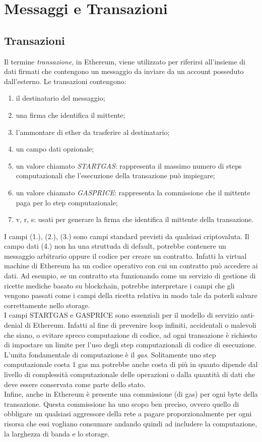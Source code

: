 \section{Messaggi e Transazioni}
%
\subsection{Transazioni}
%
Il termine \emph{transazione}, in Ethereum, viene utilizzato per riferirsi all'insieme di dati firmati che contengono un messaggio da inviare da un account posseduto dall'esterno. Le transazioni contengono:
\begin{enumerate}
	\item il destinatario del messaggio;
	\item una firma che identifica il mittente;
	\item l'ammontare di ether da trasferire al destinatario;
	\item un campo dati opzionale;
	\item un valore chiamato \emph{STARTGAS}: rappresenta il massimo numero di steps computazionali che l'esecuzione della transazione può impiegare;
	\item un valore chiamato \emph{GASPRICE}:  rappresenta la commissione che il mittente paga per lo step computazionale;
	\item v, r, s: usati per generare la firma che identifica il mittente della transazione.
\end{enumerate}
%
I campi (1.), (2.), (3.) sono campi standard previsti da qualsiasi criptovaluta. Il campo dati (4.) non ha una struttuda di default, potrebbe contenere un messaggio arbitrario oppure il codice per creare un contratto. Infatti la virtual machine di Ethereum ha un codice operativo con cui un contratto può accedere ai dati. Ad esempio, se un contratto sta funzionando come un servizio di gestione di ricette mediche basato su blockchain, potrebbe interpretare i campi che gli vengono passati come i campi della ricetta relativa in modo tale da poterli salvare correttamente nello storage. \\
I campi STARTGAS e GASPRICE sono essenziali per il modello di servizio anti-denial di Ethereum. Infatti al fine di prevenire loop infiniti, accidentali o malevoli che siano, o evitare spreco computazione di codice, ad ogni transazione è richiesto di impostare un limite per l'uso degli step computazionali di codice di esecuzione. L'unita fondamentale di computazione è il \emph{gas}. Solitamente uno step computazionale costa 1 gas ma potrebbe anche costa di più in quanto dipende dal livello di complessità computazionale delle operazioni o dalla quantità di dati che deve essere conservata come parte dello stato.\\
Infine, anche in Ethereum è presente una commissione (di gas) per ogni byte della transazione. Questa commissione ha uno scopo ben preciso, ovvero quello di obbligare un qualsiasi aggressore della rete a pagare proporzionalmente per ogni risorsa che essi vogliano consumare andando quindi ad includere la computazione, la larghezza di banda e lo storage.
%
